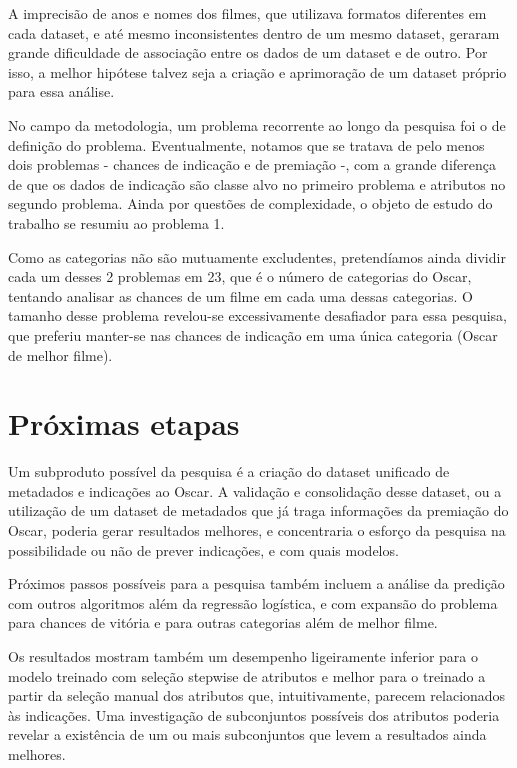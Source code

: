         A imprecisão de anos e nomes dos filmes, que utilizava formatos diferentes em cada dataset, e até mesmo inconsistentes dentro de um mesmo dataset, geraram grande dificuldade de associação entre os dados de um dataset e de outro. Por isso, a melhor hipótese talvez seja a criação e aprimoração de um dataset próprio para essa análise.
        
        No campo da metodologia, um problema recorrente ao longo da pesquisa foi o de definição do problema. Eventualmente, notamos que se tratava de pelo menos dois problemas - chances de indicação e de premiação -, com a grande diferença de que os dados de indicação são classe alvo no primeiro problema e atributos no segundo problema. Ainda por questões de complexidade, o objeto de estudo do trabalho se resumiu ao problema 1.
        
        Como as categorias não são mutuamente excludentes, pretendíamos ainda dividir cada um desses 2 problemas em 23, que é o número de categorias do Oscar, tentando analisar as chances de um filme em cada uma dessas categorias. O tamanho desse problema revelou-se excessivamente desafiador para essa pesquisa, que preferiu manter-se nas chances de indicação em uma única categoria (Oscar de melhor filme).
    
    \section[Próximas etapas da pesquisa]{Próximas etapas}
        Um subproduto possível da pesquisa é a criação do dataset unificado de metadados e indicações ao Oscar. A validação e consolidação desse dataset, ou a utilização de um dataset de metadados que já traga informações da premiação do Oscar, poderia gerar resultados melhores, e concentraria o esforço da pesquisa na possibilidade ou não de prever indicações, e com quais modelos.
        
        Próximos passos possíveis para a pesquisa também incluem a análise da predição com outros algoritmos além da regressão logística, e com expansão do problema para chances de vitória e para outras categorias além de melhor filme.
        
        Os resultados mostram também um desempenho ligeiramente inferior para o modelo treinado com seleção stepwise de atributos e melhor para o treinado a partir da seleção manual dos atributos que, intuitivamente, parecem relacionados às indicações. Uma investigação de subconjuntos possíveis dos atributos poderia revelar a existência de um ou mais subconjuntos que levem a resultados ainda melhores.

